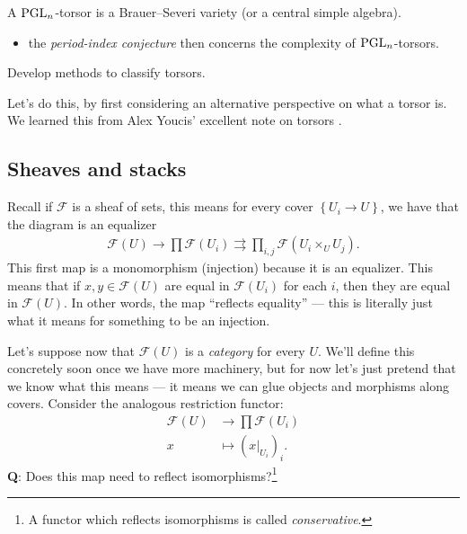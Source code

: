 \documentclass[11pt,openany]{book}
\begin{document}
\begin{example} A $\mathrm{PGL}_n$-torsor is a Brauer--Severi variety (or a central simple algebra).
\end{example}
\begin{itemize}
    \item the \textit{period-index conjecture} then concerns the complexity of $\mathrm{PGL}_n$-torsors.
\end{itemize}

\begin{goal} Develop methods to classify torsors.
\end{goal}





Let's do this, by first considering an alternative perspective on what a torsor is. We learned this from Alex Youcis' excellent note on torsors \cite{Youcis}.

\subsection{Sheaves and stacks}

Recall if $\mathscr{F}$ is a sheaf of sets, this means for every cover $\left\{ U_i \to U \right\}$, we have that the diagram is an equalizer
\begin{align*}
    \mathcal{F}(U) \to \prod \mathcal{F}(U_i) \rightrightarrows \prod_{i,j} \mathcal{F}(U_i \times_U U_j).
\end{align*}
This first map is a monomorphism (injection) because it is an equalizer. This means that if $x,y \in \mathcal{F}(U)$ are equal in $\mathcal{F}(U_i)$ for each $i$, then they are equal in $\mathcal{F}(U)$. In other words, the map ``reflects equality'' --- this is literally just what it means for something to be an injection.

Let's suppose now that $\mathcal{F}(U)$ is a \textit{category} for every $U$. We'll define this concretely soon once we have more machinery, but for now let's just pretend that we know what this means --- it means we can glue objects and morphisms along covers. Consider the analogous restriction functor:
\begin{align*}
    \mathcal{F}(U) &\to \prod \mathcal{F}(U_i) \\
    x &\mapsto \left( x|_{U_i} \right)_i.
\end{align*}
%
\textbf{Q}: Does this map need to reflect isomorphisms?\footnote{A functor which reflects isomorphisms is called \textit{conservative}.}
\end{document}
